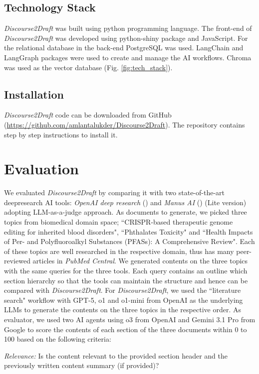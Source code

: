 \documentclass[utf8]{FrontiersinHarvard} %
\newcommand{\appname}{\emph{Discourse2Draft}}
\begin{document}
\subsection{Technology Stack}
\appname{} was built using python programming language. The front-end of \appname{} was developed using python-shiny package and JavaScript. For the relational database in the back-end PostgreSQL was used. LangChain and LangGraph packages were used to create and manage the AI workflows. Chroma was used as the vector database (Fig. \ref{fig:tech_stack}).

\subsection{Installation}

\appname{} code can be downloaded from GitHub (\url{https://github.com/amlantalukder/Discourse2Draft}). The repository contains step by step instructions to install it.

\section{Evaluation}

We evaluated \appname{} by comparing it with two state-of-the-art deepresearch AI tools: \emph{OpenAI deep research} (\citep{deepresearch2025openai}) and \emph{Manus AI} (\citep{shen2025mind}) (Lite version) adopting LLM-as-a-judge approach. As documents to generate, we picked three topics from biomedical domain space; ``CRISPR-based therapeutic genome editing for inherited blood disorders", ``Phthalates Toxicity" and ``Health Impacts of Per- and Polyfluoroalkyl Substances (PFASs): A Comprehensive Review". Each of these topics are well researched in the respective domain, thus has many peer-reviewed articles in \emph{PubMed Central}. We generated contents on the three topics with the same queries for the three tools. Each query contains an outline which section hierarchy so that the tools can maintain the structure and hence can be compared with \appname{}. For \appname{}, we used the ``literature search" workflow with GPT-5, o1 and o1-mini from OpenAI as the underlying LLMs to generate the contents on the three topics in the respective order. As evaluator, we used two AI agents using o3 from OpenAI and Gemini 3.1 Pro from Google to score the contents of each section of the three documents within 0 to 100 based on the following criteria: 

\textit{Relevance:} Is the content relevant to the provided section header and the previously written content summary (if provided)?
\end{document}
